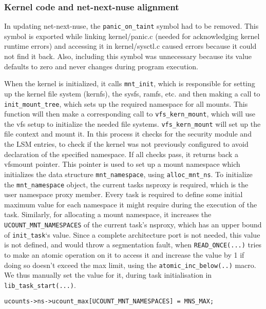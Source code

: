 \documentclass{sig-alternate}
\begin{document}
\subsubsection{Kernel code and net-next-nuse alignment}
In updating net-next-nuse, the \texttt{panic\_on\_taint} symbol had to be removed.  This symbol is exported while linking kernel/panic.c (needed for acknowledging kernel
runtime errors) and accessing it in kernel/sysctl.c caused errors because it could not find it back. Also, including this symbol was unnecessary because its
value defaults to zero and never changes during program execution.

When the kernel is initialized, it calls \texttt{mnt\_init}, which is
responsible for setting
up the kernel file system (kernfs), the sysfs, ramfs, etc. and then making a
call to \texttt{init\_mount\_tree}, which sets up the required namespace for all
mounts. This function will then make a corresponding call to \texttt{vfs\_kern\_mount}, which will use the vfs setup to initialize the needed file systems.
\texttt{vfs\_kern\_mount} will set up the file context and mount it. In this process it checks for the security module and the LSM entries, to check
if the kernel was not previously configured to avoid declaration of the specified namespace. If all checks pass, it returns back a vfsmount
pointer. This pointer is used to set up a mount namespace which initializes the data structure \texttt{mnt\_namespace}, using \texttt{alloc\_mnt\_ns}. To
initialize the \texttt{mnt\_namespace} object, the current tasks nsproxy is required, which is the user namespace proxy member. Every task is required to
define some initial maximum value for each namespace it might require during the execution of the task. Similarly, for allocating a mount
namespace, it increases the \texttt{UCOUNT\_MNT\_NAMESPACES} of the current task’s nsproxy, which has an upper bound of \texttt{init\_task}‘s value.  Since
a complete architecture port is not needed, this value is not defined, and
would throw a segmentation fault, when \texttt{READ\_ONCE(...)} tries to make
an atomic operation on it to access it and increase the value by 1 if doing so doesn’t exceed the max limit, using the \texttt{atomic\_inc\_below(..)} macro.
We thus manually set the value for it, during task initialisation in \texttt{lib\_task\_start(...)}.

\begin{lstlisting}[style=CStyle]
ucounts->ns->ucount_max[UCOUNT_MNT_NAMESPACES] = MNS_MAX;
\end{lstlisting}
\end{document}
